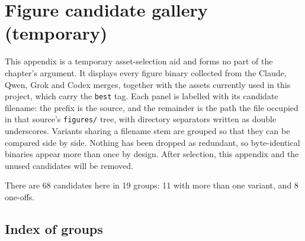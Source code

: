 
\clearpage
\renewcommand{\thesection}{\thechapter.\Alph{section}}
\section{Figure candidate gallery (temporary)}
\label{a:app:figuregallery}

This appendix is a temporary asset-selection aid and forms no part of the
chapter's argument. It displays every figure binary collected from the Claude,
Qwen, Grok and Codex merges, together with the assets currently used in this
project, which carry the \texttt{best} tag. Each panel is labelled with its
candidate filename: the prefix is the source, and the remainder is the path the
file occupied in that source's \texttt{figures/} tree, with directory
separators written as double underscores. Variants sharing a filename stem are
grouped so that they can be compared side by side. Nothing has been dropped as
redundant, so byte-identical binaries appear more than once by design. After
selection, this appendix and the unused candidates will be removed.

There are 68 candidates here in 19 groups: 11
with more than one variant, and 8 one-offs.

\subsection*{Index of groups}

